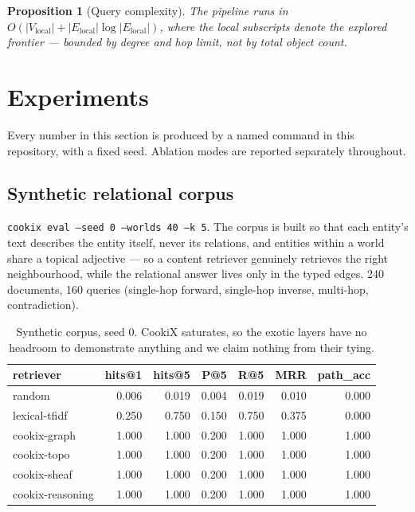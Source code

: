 \documentclass[11pt]{article}
\newtheorem{proposition}[theorem]{Proposition}
\theoremstyle{definition}
\newcommand{\cmd}[1]{\texttt{\small #1}}
\begin{document}
\begin{proposition}[Query complexity]
The pipeline runs in $O(|V_{\mathrm{local}}| + |E_{\mathrm{local}}|\log
|E_{\mathrm{local}}|)$, where the local subscripts denote the explored frontier ---
bounded by degree and hop limit, not by total object count.
\end{proposition}

\section{Experiments}
\label{sec:experiments}

Every number in this section is produced by a named command in this repository, with a
fixed seed. Ablation modes are reported separately throughout.

\subsection{Synthetic relational corpus}

\cmd{cookix eval --seed 0 --worlds 40 --k 5}. The corpus is built so that each entity's
text describes the entity itself, never its relations, and entities within a world share
a topical adjective --- so a content retriever genuinely retrieves the right
neighbourhood, while the relational answer lives only in the typed edges. 240 documents,
160 queries (single-hop forward, single-hop inverse, multi-hop, contradiction).

\begin{table}[h]
\centering
\begin{tabular}{lrrrrrr}
\toprule
retriever & hits@1 & hits@5 & P@5 & R@5 & MRR & path\_acc \\
\midrule
random           & 0.006 & 0.019 & 0.004 & 0.019 & 0.010 & 0.000 \\
lexical-tfidf    & 0.250 & 0.750 & 0.150 & 0.750 & 0.375 & 0.000 \\
cookix-graph     & 1.000 & 1.000 & 0.200 & 1.000 & 1.000 & 1.000 \\
cookix-topo      & 1.000 & 1.000 & 0.200 & 1.000 & 1.000 & 1.000 \\
cookix-sheaf     & 1.000 & 1.000 & 0.200 & 1.000 & 1.000 & 1.000 \\
cookix-reasoning & 1.000 & 1.000 & 0.200 & 1.000 & 1.000 & 1.000 \\
\bottomrule
\end{tabular}
\caption{Synthetic corpus, seed 0. CookiX saturates, so the exotic layers have no
headroom to demonstrate anything and we claim nothing from their tying.}
\end{table}
\end{document}
